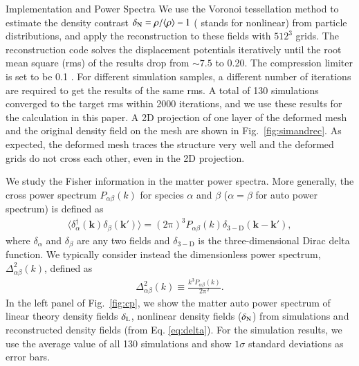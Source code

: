 \begin{section}{Implementation and Power Spectra}
 We use the Voronoi tessellation method \citep{bib:Van1994} to estimate the density contrast
 $\delta_\mathrm{\textcolor{black}{N}}=\rho/\langle\rho\rangle-1$ ( stands for nonlinear) from particle distributions, and apply the
  reconstruction to these fields with $512^3$ grids.
 The reconstruction code solves the displacement potentials iteratively
 until the root mean square (rms) of the results drop from $\sim 7.5$
 to 0.20. The compression limiter is set to be 0.1 \citep{bib:Pen1995, bib:Pen1998,bib:ZhuH2016}. 
 For different simulation samples, a different number of
 iterations are required to get the results of the same rms. A total of
 130 simulations converged to the target rms within 2000 iterations, 
 and we use these results for the calculation in this paper.
 A 2\tcr{$-$}D projection
 of one layer of the deformed mesh and the original density field on
 the mesh are shown in Fig.~\ref{fig:simandrec}. 
 As expected, the deformed mesh traces the structure very well and
 the deformed grids do not cross each other, even in the 2\tcr{$-$}D projection.
 
 We study the Fisher information in the matter power
 spectra. More generally,
 the cross power spectrum $P_{\alpha\beta}(k)$ for species $\alpha$ and $\beta$
 ($\alpha=\beta$ for auto power spectrum) is defined as
 \begin{align}
   \langle \delta_\alpha^\dagger(\bm{k})\delta_\beta(\bm{k}') \rangle =
   (2\mathrm{\pi})^3 P_{\alpha\beta}(k) \delta_{\mathrm {3-D}}(\bm{k}-\bm{k}'),
 \end{align}
 where $\delta_{\alpha}$ and $\delta_{\beta}$ are any two fields and
 $\delta_{\mathrm{3-D}}$ is the three-dimensional Dirac delta function. We typically consider instead
 the dimensionless power spectrum, $\Delta_{\alpha\beta}^2(k)$, defined as
 \begin{align}
   \Delta_{\alpha\beta}^2(k) \equiv \frac{k^3 P_{\alpha\beta}(k)}{2\mathrm{\pi} ^2}.
 \end{align}
 In the left panel of Fig.~\ref{fig:cp}, we show the matter auto power
 spectrum of linear theory density fields $\delta_\mathrm{\textcolor{black}{L}}$, nonlinear density
 fields ($\delta_\mathrm{\textcolor{black}{N}}$) from simulations and reconstructed density fields
 (from Eq. \ref{eq:delta}).  For the simulation
 results, we use the average value of all 130 simulations and show
 $1\sigma$ standard deviations as error bars.  


\end{section}
